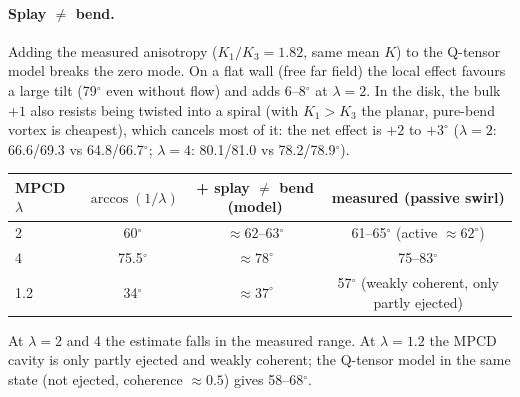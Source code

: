 \documentclass[11pt,a4paper]{article}
\begin{document}
\paragraph{Splay $\neq$ bend.} Adding the measured anisotropy ($K_1/K_3=1.82$, same mean $K$) to the Q-tensor model breaks the zero mode. On a flat wall (free far field) the local
effect favours a large tilt (79$^\circ$ even without flow) and adds 6--8$^\circ$ at $\lambda=2$. In the disk, the bulk $+1$ also resists being twisted into a spiral (with $K_1>K_3$ the
planar, pure-bend vortex is cheapest), which cancels most of it: the net effect is $+2$ to $+3^\circ$ ($\lambda=2$: 66.6/69.3 vs 64.8/66.7$^\circ$; $\lambda=4$: 80.1/81.0 vs 78.2/78.9$^\circ$).
\begin{center}\small
\begin{tabular}{lccc}\toprule
MPCD $\lambda$ & $\arccos(1/\lambda)$ & + splay $\neq$ bend (model) & measured (passive swirl)\\\midrule
2 & 60$^\circ$ & $\approx62$--63$^\circ$ & 61--65$^\circ$ (active $\approx62^\circ$)\\
4 & 75.5$^\circ$ & $\approx78^\circ$ & 75--83$^\circ$\\
1.2 & 34$^\circ$ & $\approx37^\circ$ & 57$^\circ$ (weakly coherent, only partly ejected)\\\bottomrule
\end{tabular}
\end{center}
At $\lambda=2$ and 4 the estimate falls in the measured range. At $\lambda=1.2$ the MPCD cavity is only partly ejected and weakly coherent; the Q-tensor model in the same state
(not ejected, coherence $\approx0.5$) gives 58--68$^\circ$.
\end{document}
